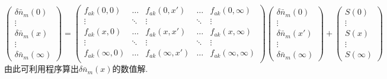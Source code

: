 \documentclass{article}
\begin{document}
	\begin{equation}\label{eq:13}
		\begin{pmatrix}
			\delta\bar{n}_m(0)\\ \vdots\\ \delta\bar{n}_m(x)\\ \vdots \\ \delta\bar{n}_m(\infty)
		\end{pmatrix}
		=
		\begin{pmatrix}
			f_{ak}(0,0)&\dots&f_{ak}(0,x')&\dots&f_{ak}(0,\infty)\\
			\vdots&\ddots&\vdots&\ddots&\vdots\\
			f_{ak}(x,0)&\dots&f_{ak}(x,x')&\dots&f_{ak}(x,\infty)\\
			\vdots&\ddots&\vdots&\ddots&\vdots\\
			f_{ak}(\infty,0)&\dots&f_{ak}(\infty,x')&\dots&f_{ak}(\infty,\infty)\\
		\end{pmatrix}
		\begin{pmatrix}
			\delta\bar{n}_m(0)\\ \vdots\\ \delta\bar{n}_m(x')\\ \vdots \\ \delta\bar{n}_m(\infty)
		\end{pmatrix}
		+
		\begin{pmatrix}
			S(0)\\ \vdots\\S(x)\\ \vdots\\S(\infty)
		\end{pmatrix}
	\end{equation}
	由此可利用程序算出$\delta\bar n_m(x)$的数值解.
	
\end{document}

